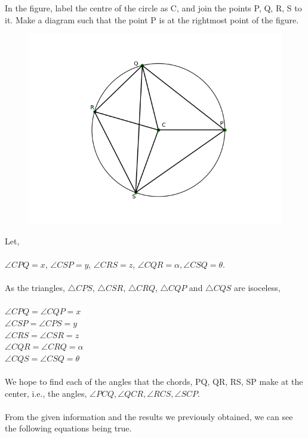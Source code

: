 \documentclass[8pt, twocolumn]{article}
\begin{document}
In the figure, label the centre of the circle as C, and join the points P, Q, R, S to it. Make a diagram such that the point P is at the rightmost point of the figure. \\
\newpage
\begin{figure}[ht]
    \centering
    \includegraphics[scale = 0.5]{figs/pre_cnstrct_fig1.png}
    \end{figure}
Let,\\\\
$\angle CPQ = x$, $\angle CSP = y$, $\angle CRS = z$, $\angle CQR = \alpha, \angle CSQ = \theta .$\\\\
As the triangles, $\triangle CPS$, $\triangle CSR$, $\triangle CRQ$, $\triangle CQP$ and $\triangle CQS$ are isoceless,\\\\
$\angle CPQ = \angle CQP = x$\\
$\angle CSP = \angle CPS = y$\\
$\angle CRS = \angle CSR = z$\\
$\angle CQR = \angle CRQ = \alpha$\\
$\angle CQS = \angle CSQ = \theta$\\\\
We hope to find each of the angles that the chords, PQ, QR, RS, SP make at the center, i.e., the angles, $\angle PCQ, \angle QCR, \angle RCS, \angle SCP$.\\\\
From the given information and the results we previously obtained, we can see the following equations being true.
\end{document}
